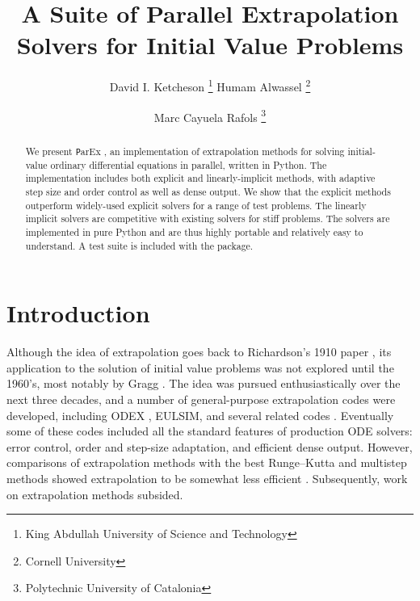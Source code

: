 \documentclass[12pt]{article}
\newcommand{\parex}{\texttt ParEx }
\begin{document}
\title{A Suite of Parallel Extrapolation Solvers for Initial Value Problems}
\author{David I. Ketcheson
\thanks{King Abdullah University of Science and Technology}
Humam Alwassel
\thanks{Cornell University} \and
Marc Cayuela Rafols
\thanks{Polytechnic University of Catalonia} \and
}

\maketitle

\begin{abstract}
We present \parex, an implementation of extrapolation 
methods for solving initial-value ordinary differential equations
in parallel, written in Python.
The implementation includes both explicit and  linearly-implicit methods, with
adaptive step size and order control as well as dense output.
We show that the 
explicit methods outperform widely-used explicit solvers for a 
range of test problems.
The linearly implicit solvers are competitive with existing solvers
for stiff problems.%
The solvers are
implemented in pure Python and are thus highly portable and 
relatively easy to understand.
A test suite is included with the package.
\end{abstract}




\section{Introduction}
Although the idea of extrapolation goes back to Richardson's
1910 paper \cite{richardson1910approximate},
its application to the solution of initial value problems
was not explored until the 1960's, most notably by Gragg \cite{gragg1965extrapolation}.
The idea was pursued enthusiastically over the next three
decades, and a number of general-purpose extrapolation codes
were developed, including ODEX \cite{HairerODEX}, EULSIM, and several related codes \cite{extrapolation_codes}.  
Eventually some of these codes included 
all the standard features of production ODE solvers:
error control, order and step-size adaptation, and 
efficient dense output.
However, comparisons of extrapolation methods with
the best Runge--Kutta and multistep methods showed 
extrapolation to be somewhat less efficient \cite{Shampine1986,hosea1994a}.
Subsequently, work on extrapolation methods subsided.
\end{document}
